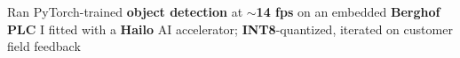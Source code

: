 {\begin{experiences}
{\begin{itemize}
{                \item Ran PyTorch-trained \textbf{object detection} at \textbf{$\sim$14 fps} on an embedded \textbf{Berghof PLC} I fitted with a \textbf{Hailo} AI accelerator\ifcvshowmldetail; \textbf{INT8}-quantized, iterated on customer field feedback\fi
                \fi}
                \def\cvFhgSafety{\ifcvshowsafety
                \item Built \textbf{person detection} for an industrial customer's safety system, with \textbf{4 cameras} in parallel and \textbf{batched} inference
                \fi}

\end{itemize}}
\end{experiences}}
